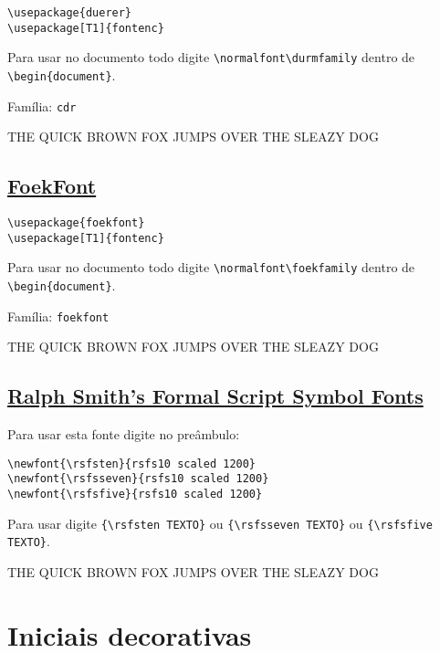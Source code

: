 \documentclass[a4paper]{article}
\newcommand{\fonte}[2]{
  {\fontfamily{#1}\selectfont #2}
}
\begin{document}
\begin{verbatim}
\usepackage{duerer}
\usepackage[T1]{fontenc}
\end{verbatim} 

Para usar no documento todo digite \verb|\normalfont\durmfamily| dentro de \verb|\begin{document}|.

Família: \texttt{cdr}

{\normalfont\durmfamily

THE QUICK BROWN FOX JUMPS OVER THE SLEAZY DOG}


\subsection*{\href{http://www.tug.dk/FontCatalogue/foekfont/}{FoekFont}}

\begin{verbatim}
\usepackage{foekfont}
\usepackage[T1]{fontenc}
\end{verbatim} 

Para usar no documento todo digite \verb|\normalfont\foekfamily| dentro de \verb|\begin{document}|.

Família: \texttt{foekfont}

\fonte{foekfont}{THE QUICK BROWN FOX JUMPS OVER THE SLEAZY DOG}


\subsection*{\href{http://www.tug.dk/FontCatalogue/rfsf/}{Ralph Smith's Formal Script Symbol Fonts}}

Para usar esta fonte digite no preâmbulo:


\begin{verbatim}
\newfont{\rsfsten}{rsfs10 scaled 1200}
\newfont{\rsfsseven}{rsfs10 scaled 1200}
\newfont{\rsfsfive}{rsfs10 scaled 1200}
\end{verbatim} 

Para usar digite \verb|{\rsfsten TEXTO}| ou \verb|{\rsfsseven TEXTO}| ou \verb|{\rsfsfive TEXTO}|.

{\rsfsten THE QUICK BROWN FOX JUMPS OVER THE SLEAZY DOG}




\section*{Iniciais decorativas}
\end{document}
